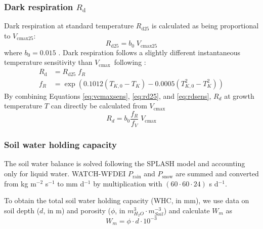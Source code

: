 \documentclass{myreport}
\newcommand{\vcmax}{$V_{\text{cmax}}$}
\begin{document}
\subsubsection{Dark respiration $R_{\mathrm{d}}$}

Dark respiration at standard temperature $R_{\mathrm{d25}}$ is calculated as being proportional to $V_{\mathrm{cmax25}}$:
\begin{equation}
\label{eq:rd25}
    R_{\mathrm{d25}} = b_0 \; V_{\mathrm{cmax25}}
\end{equation}
where $b_0 = 0.015$ \citep{atkin15}. Dark respiration follows a slightly different instantaneous temperature sensitivity than \vcmax\ following \cite{heskel16}:
\begin{align}
\label{eq:rdsens}
    R_{\mathrm{d}} &=  R_{\mathrm{d25}}\; f_R  \\
    f_R &= \exp \left(  0.1012(T_{K,0}-T_K) - 0.0005(T_{K,0}^2-T_K^2) \right) 
\end{align}
By combining Equations \ref{eq:vcmaxsens}, \ref{eq:rd25}, and \ref{eq:rdsens}, $R_d$ at growth temperature $T$ can directly be calculated from $V_{\mathrm{cmax}}$
\begin{equation}
    R_d = b_0 \frac{f_R}{f_V}\;V_{\mathrm{cmax}}
\end{equation}





\subsubsection{Soil water holding capacity}
\label{sec:whc}
The soil water balance is solved following the SPLASH model and accounting only for liquid water. WATCH-WFDEI $P_{\text{rain}}$ and $P_{\text{snow}}$ are summed and converted from kg m$^{-2}$ s$^{-1}$ to mm d$^{-1}$ by multiplication with $(60 \cdot 60 \cdot 24)$ s d$^{-1}$. 



To obtain the total soil water holding capacity (WHC, in mm), we use data on soil depth ($d$, in m) and porosity ($\phi$, in $m_{H_{2}O}^{3} \cdot m_{Soil}^{-3}$) and calculate $W_m$ as
\begin{equation}
    W_m = \phi \cdot d \cdot 10^{-3}
\end{equation}
\end{document}
